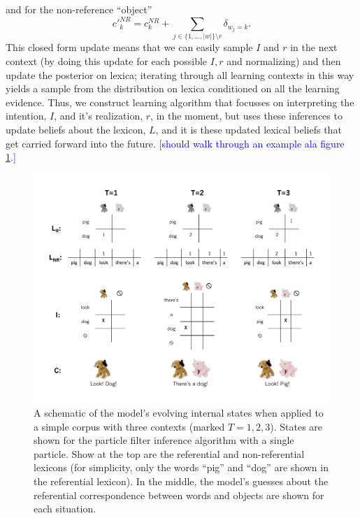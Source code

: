 \documentclass[man,noapacite,12pt]{apa2}
\newcommand{\nnote}[1]{\textcolor{blue}{[#1]}}
\begin{document}

and for the non-reference ``object''
$$
c'^{NR}_{k} = c^{NR}_{k} + \sum_{j \in \{1,\dots,|w|\} \setminus r} \delta_{w_{j}=k}.
$$
This closed form update means that we can easily sample $I$ and $r$ in the next context (by doing this update for each possible $I,r$ and normalizing) and then update the posterior on lexica; iterating through all learning contexts in this way yields a sample from the distribution on lexica conditioned on all the learning evidence.
%
Thus, we construct learning algorithm that focusses on interpreting the intention, $I$, and it's realization, $r$, in the moment, but uses these inferences to update beliefs about the lexicon, $L$, and it is these updated lexical beliefs that get carried forward into the future. \nnote{should walk through an example ala figure \ref{fig:inference_diagram}.}

\begin{figure}[H]
\begin{center}
\includegraphics[width=6.25in]{figures/inference_diagram.pdf}
\caption{\label{fig:inference_diagram} A schematic of the model's evolving internal states when applied to a simple corpus with three contexts (marked $T=1,2,3$). States are shown for the particle filter inference algorithm with a single particle. Show at the top are the referential and non-referential lexicons (for simplicity, only the words ``pig'' and ``dog'' are shown in the referential lexicon). In the middle, the model's guesses about the referential correspondence between words and objects are shown for each situation.}
\end{center}
\end{figure}
\end{document}
